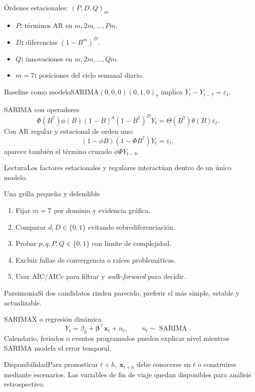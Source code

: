 \documentclass[aspectratio=169,10pt]{beamer}
\newcommand{\concepto}[1]{\textcolor{UAPTeal}{\textbf{#1}}}
\begin{document}
\begin{frame}{Órdenes estacionales: $(P,D,Q)_m$}\small
\begin{itemize}\item \concepto{$P$:} términos AR en $m,2m,\ldots,Pm$.\item \concepto{$D$:} diferencias $(1-B^m)^D$.\item \concepto{$Q$:} innovaciones en $m,2m,\ldots,Qm$.\item \concepto{$m=7$:} posiciones del ciclo semanal diario.\end{itemize}
\begin{block}{Baseline como modelo}SARIMA$(0,0,0)(0,1,0)_7$ implica $Y_t-Y_{t-7}=\varepsilon_t$.\end{block}
\end{frame}

\begin{frame}{SARIMA con operadores}\small
\[\Phi(B^7)\phi(B)(1-B)^d(1-B^7)^DY_t=\Theta(B^7)\theta(B)\varepsilon_t.\]
Con AR regular y estacional de orden uno:
\[(1-\phi B)(1-\Phi B^7)Y_t=\varepsilon_t,\]
aparece también el término cruzado $\phi\Phi Y_{t-8}$.
\begin{block}{Lectura}Los factores estacionales y regulares interactúan dentro de un único modelo.\end{block}
\end{frame}

\begin{frame}{Una grilla pequeña y defendible}\small
\begin{enumerate}\item Fijar $m=7$ por dominio y evidencia gráfica.\item Comparar $d,D\in\{0,1\}$ evitando sobrediferenciación.\item Probar $p,q,P,Q\in\{0,1\}$ con límite de complejidad.\item Excluir fallas de convergencia o raíces problemáticas.\item Usar AIC/AICc para filtrar y \textit{walk-forward} para decidir.\end{enumerate}
\begin{block}{Parsimonia}Si dos candidatos rinden parecido, preferir el más simple, estable y actualizable.\end{block}
\end{frame}

\begin{frame}{SARIMAX o regresión dinámica}\small
\[Y_t=\beta_0+\boldsymbol\beta^\top\mathbf x_t+n_t,\qquad n_t\sim\operatorname{SARIMA}.\]
Calendario, feriados o eventos programados pueden explicar nivel mientras SARIMA modela el error temporal.
\begin{alertblock}{Disponibilidad}Para pronosticar $t+h$, $\mathbf x_{t+h}$ debe conocerse en $t$ o construirse mediante escenarios. Las variables de fin de viaje quedan disponibles para análisis retrospectivo.\end{alertblock}
\end{frame}
\end{document}
